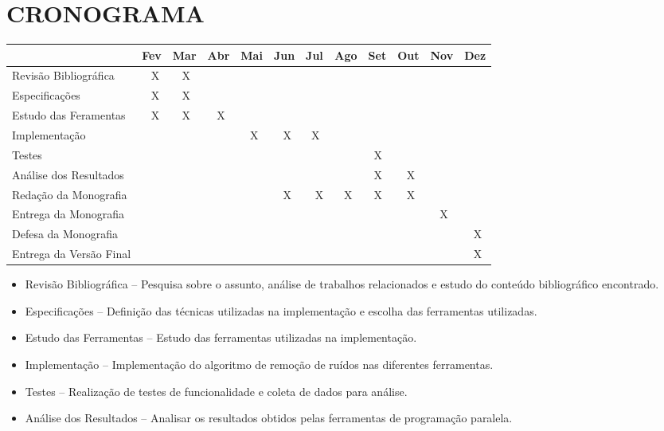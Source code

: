 
\chapter{CRONOGRAMA}
\label{chap:cronograma}

\begin{table}[H]
\centering
\begin{tabular}{|l|l|l|l|l|l|l|l|l|l|l|l|} 
\hline
                        & Fev & Mar & Abr & Mai & Jun & Jul & Ago & Set & Out & Nov & Dez  \\ 
\hline
Revisão Bibliográfica   & ~ X & ~ X & ~~  &     &     &     &     &     &     &     &      \\ 
\hline
Especificações          & ~ X & ~ X & ~~  &     &     &     &     &     &     &     &      \\ 
\hline
Estudo das Feramentas   & ~ X & ~ X & ~ X &     &     &     &     &     &     &     &      \\ 
\hline
Implementação           &     &     &     & ~ X & ~ X & ~X  &     &     &     &     &      \\ 
\hline
Testes                  &     &     &     &     &     &     &     & ~X  & ~~  &     &      \\ 
\hline
Análise dos Resultados  &     &     &     &     &     &     &     & ~X  & ~ X &     &      \\ 
\hline
Redação da Monografia   &     &     &     &     & ~ X & ~ X & ~ X & ~X  & ~ X &     &      \\ 
\hline
Entrega da Monografia   &     &     &     &     &     &     &     &     &     & ~ X &      \\ 
\hline
Defesa da Monografia    &     &     &     &     &     &     &     &     &     &     & ~ X  \\ 
\hline
Entrega da Versão Final &     &     &     &     &     &     &     &     &     &     & ~ X  \\
\hline
\end{tabular}
\end{table}

\begin{itemize}
    \item Revisão Bibliográfica – Pesquisa sobre o assunto, análise de trabalhos relacionados e
estudo do conteúdo bibliográfico encontrado.
    \item Especificações – Definição das técnicas utilizadas na implementação e escolha das
ferramentas utilizadas.
    \item Estudo das Ferramentas – Estudo das ferramentas utilizadas na implementação.
    \item Implementação – Implementação do algoritmo de remoção de ruídos nas diferentes
ferramentas.
    \item Testes – Realização de testes de funcionalidade e coleta de dados para análise.
    \item Análise dos Resultados – Analisar os resultados obtidos pelas ferramentas de
programação paralela.
\end{itemize}
